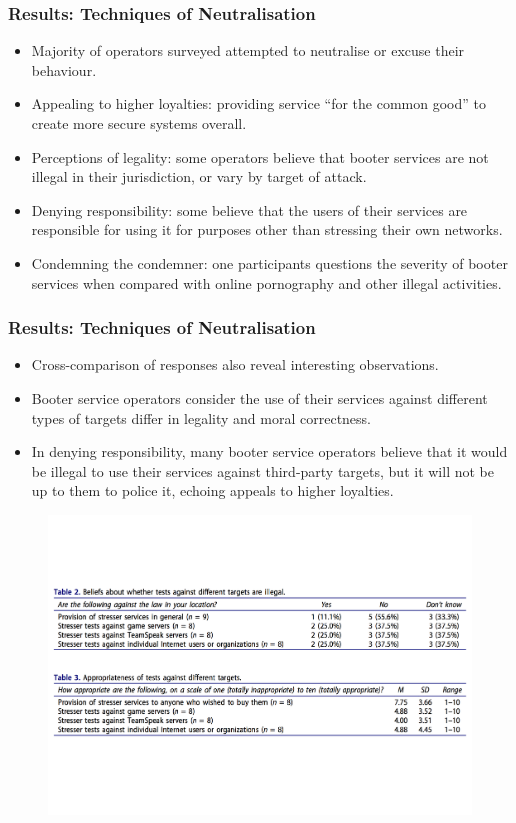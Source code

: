 \documentclass[aspectratio=1610]{beamer}
\begin{document}
\begin{frame}
\frametitle{Results: Techniques of Neutralisation}
\begin{itemize}
\setlength\itemsep{1em}
\item Majority of operators surveyed attempted to neutralise or excuse their behaviour.
\item Appealing to higher loyalties: providing service ``for the common good'' to create more secure systems overall.
\item Perceptions of legality: some operators believe that booter services are not illegal in their jurisdiction, or vary by target of attack.
\item Denying responsibility: some believe that the users of their services are responsible for using it for purposes other than stressing their own networks.
\item Condemning the condemner: one participants questions the severity of booter services when compared with online pornography and other illegal activities.  
\end{itemize}
\end{frame}

\begin{frame}
\frametitle{Results: Techniques of Neutralisation}
\begin{itemize}
\setlength\itemsep{1em}
\item Cross-comparison of responses also reveal interesting observations.
\item Booter service operators consider the use of their services against different types of targets differ in legality and moral correctness.
\item In denying responsibility, many booter service operators believe that it would be illegal to use their services against third-party targets, but it will not be up to them to police it, echoing appeals to higher loyalties.
\end{itemize}
\vspace{-5em}
\begin{figure}
\centering
\includegraphics[scale=0.4]{fig1.pdf}
\end{figure}
\end{frame}
\end{document}
